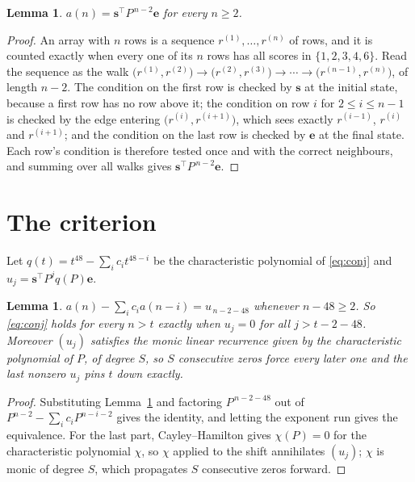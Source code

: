 \documentclass[11pt,a4paper]{article}
\theoremstyle{plain}
\newtheorem{lemma}[theorem]{Lemma}
\theoremstyle{definition}
\begin{document}
\begin{lemma}\label{lem:walk}
$a(n)=\mathbf{s}^{\!\top}P^{\,n-2}\mathbf{e}$ for every $n\ge2$.
\end{lemma}

\begin{proof}
An array with $n$ rows is a sequence $r^{(1)},\dots,r^{(n)}$ of rows, and it is counted
exactly when every one of its $n$ rows has all scores in $\{1,2,3,4,6\}$. Read the sequence as the
walk $\bigl(r^{(1)},r^{(2)}\bigr)\to\bigl(r^{(2)},r^{(3)}\bigr)\to\cdots\to
\bigl(r^{(n-1)},r^{(n)}\bigr)$, of length $n-2$. The condition on the first row is
checked by $\mathbf{s}$ at the initial state, because a first row has no row above it; the
condition on row $i$ for $2\le i\le n-1$ is checked by the edge entering
$\bigl(r^{(i)},r^{(i+1)}\bigr)$, which sees exactly $r^{(i-1)}$, $r^{(i)}$ and
$r^{(i+1)}$; and the condition on the last row is checked by $\mathbf{e}$ at the final
state. Each row's condition is therefore tested once and with the correct neighbours, and
summing over all walks gives $\mathbf{s}^{\!\top}P^{\,n-2}\mathbf{e}$.
\end{proof}

\section{The criterion}

Let $q(t)=t^{48}-\sum_i c_i t^{48-i}$ be the characteristic polynomial of
\eqref{eq:conj} and $u_j=\mathbf{s}^{\!\top}P^{j}q(P)\mathbf{e}$.

\begin{lemma}\label{lem:crit}
$a(n)-\sum_i c_i a(n-i)=u_{\,n-2-48}$ whenever $n-48\ge2$. So \eqref{eq:conj}
holds for every $n>t$ exactly when $u_j=0$ for all $j>t-2-48$. Moreover $(u_j)$
satisfies the monic linear recurrence given by the characteristic polynomial of $P$, of
degree $S$, so $S$ consecutive zeros force every later one and the last nonzero $u_j$ pins
$t$ down exactly.
\end{lemma}

\begin{proof}
Substituting Lemma~\ref{lem:walk} and factoring $P^{\,n-2-48}$ out of
$P^{n-2}-\sum_i c_i P^{n-i-2}$ gives the identity, and letting the exponent run gives the
equivalence. For the last part, Cayley--Hamilton gives $\chi(P)=0$ for the characteristic
polynomial $\chi$, so $\chi$ applied to the shift annihilates $(u_j)$; $\chi$ is monic of
degree $S$, which propagates $S$ consecutive zeros forward.
\end{proof}
\end{document}

